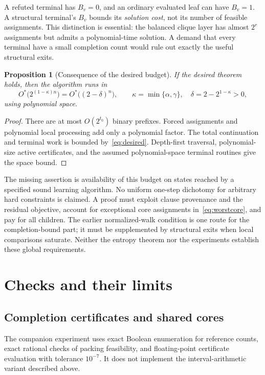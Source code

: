 \documentclass[11pt,a4paper]{article}
\newtheorem{proposition}[theorem]{Proposition}
\theoremstyle{definition}
\theoremstyle{remark}
\newcommand{\Ostar}{O^{*}}
\begin{document}
A refuted terminal has $B_v=0$, and an ordinary evaluated leaf can have
$B_v=1$. A structural terminal's $B_v$ bounds its \emph{solution cost},
not its number of feasible assignments. This distinction is essential:
the balanced clique layer has almost $2^r$ assignments but admits a
polynomial-time solution. A demand that every terminal have a small
completion count would rule out exactly the useful structural exits.

\begin{proposition}[Consequence of the desired budget]
If the desired theorem holds, then the algorithm runs in
\[
 \Ostar\bigl(2^{(1-\kappa)n}\bigr)
   =\Ostar\bigl((2-\delta)^n\bigr),\qquad
 \kappa=\min\{\alpha,\gamma\},\quad
 \delta=2-2^{1-\kappa}>0,
\]
using polynomial space.
\end{proposition}
\begin{proof}
There are at most $O(2^{t_0})$ binary prefixes. Forced assignments and
polynomial local processing add only a polynomial factor. The total
continuation and terminal work is bounded by~\eqref{eq:desired}.
Depth-first traversal, polynomial-size active certificates, and the
assumed polynomial-space terminal routines give the space bound.
\end{proof}

The missing assertion is availability of this budget on states reached
by a specified sound learning algorithm. No uniform one-step dichotomy
for arbitrary hard constraints is claimed. A proof must exploit clause
provenance and the residual objective, account for exceptional core
assignments in~\eqref{eq:worstcore}, and pay for all children. The earlier
normalized-walk condition is one route for the completion-bound part;
it must be supplemented by structural exits when local comparisons
saturate. Neither the entropy theorem nor the experiments establish
these global requirements.

\section{Checks and their limits}
\label{sec:experiments}

\subsection{Completion certificates and shared cores}

The companion experiment uses exact Boolean enumeration for reference
counts, exact rational checks of packing feasibility, and floating-point
certificate evaluation with tolerance $10^{-7}$. It does not implement
the interval-arithmetic variant described above.
\end{document}
